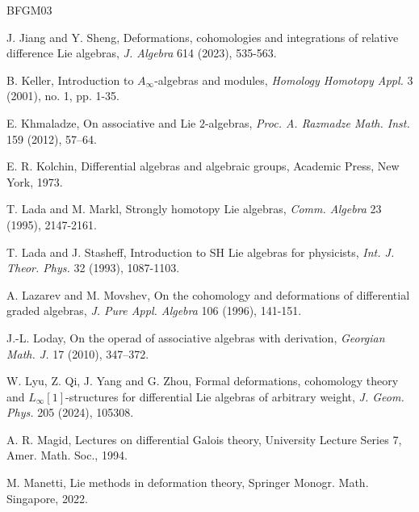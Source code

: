 \documentclass[a4paper,reqno,10pt]{amsart}
\theoremstyle{plain}
\theoremstyle{definition}
\theoremstyle{remark}
\begin{document}
\begin{thebibliography}{BFGM03}

 J. Jiang and Y. Sheng, Deformations, cohomologies and integrations of relative difference Lie algebras, {\em J. Algebra} 614 (2023), 535-563.


 B. Keller, Introduction to $A_\infty$-algebras and modules, {\em Homology Homotopy Appl.} 3 (2001), no. 1, pp. 1-35.

 E. Khmaladze,  On associative and Lie $2$-algebras, {\em Proc. A. Razmadze Math. Inst.} 159 (2012), 57–64.

 E. R. Kolchin, Differential algebras and algebraic groups, Academic Press, New York, 1973.


    T. Lada and M. Markl, Strongly homotopy Lie algebras, {\em Comm. Algebra} 23 (1995), 2147-2161.

    T. Lada and J. Stasheff, Introduction to SH Lie algebras for physicists, {\em Int. J. Theor. Phys.} 32 (1993), 1087-1103.

    A. Lazarev and M. Movshev, On the cohomology and deformations of differential graded algebras, {\em J. Pure Appl. Algebra} 106 (1996), 141-151.

    J.-L. Loday, On the operad of associative algebras with derivation, {\em Georgian Math. J.} 17 (2010), 347–372.

    W. Lyu, Z. Qi, J. Yang and G. Zhou, Formal deformations, cohomology theory and $L_\infty[1]$-structures for differential Lie algebras of arbitrary weight, {\em J. Geom. Phys.} 205 (2024), 105308.

    A. R. Magid, Lectures on differential Galois theory, University Lecture Series 7, Amer. Math. Soc., 1994.

 M. Manetti, Lie methods in deformation theory, Springer Monogr. Math. Singapore, 2022.




\end{thebibliography}
\end{document}
